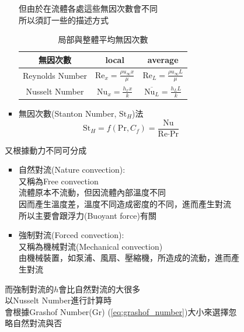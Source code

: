\documentclass[../main.tex]{subfiles}
\begin{document}
\begin{itemize}
\begin{itemize}
\begin{itemize}
\begin{enumerate}
\begin{itemize}
            但由於在流體各處這些無因次數會不同\\
            所以須訂一些的描述方式
            \renewcommand{\arraystretch}{2}
            \begin{table}[H]
              \centering
              \begin{tabular}{c|c|c}
                無因次數 & local & average \\
                \hline
                Reynolds Number & $\text{Re}_x = \frac{\rho u_\infty x}{\mu}$ & 
                  $\text{Re}_L = \frac{\rho u_\infty L}{\mu}$ \\
                \hline
                Nusselt Number & $\text{Nu}_x = \frac{h_x x}{k}$ & 
                  $\overline{\text{Nu}_L} = \frac{h_L L}{k}$ 
              \end{tabular}
              \caption{局部與整體平均無因次數}
            \end{table}
            \item 無因次數(Stanton Number, $\text{St}_H$)法
            \begin{equation}
              \text{St}_H = f(\text{Pr}, C_f)  = \frac{\text{Nu}}{\text{Re}\cdot \text{Pr}}
            \end{equation}
          \end{itemize}
          又根據動力不同可分成
          \begin{itemize}
            \item 自然對流(Nature convection):\\
              又稱為Free convection\\
              流體原本不流動，但因流體內部溫度不同\\
              因而產生溫度差，溫度不同造成密度的不同，進而產生對流\\
              所以主要會跟浮力(Buoyant force)有關
            \item 強制對流(Forced convection):\\
              又稱為機械對流(Mechanical convection)\\
              由機械裝置，如泵浦、風扇、壓縮機，所造成的流動，進而產生對流
          \end{itemize}
          而強制對流的$h$會比自然對流的大很多\\
          以Nusselt Number進行計算時\\
          會根據Grashof Number(Gr) (\ref{eq:grashof_number})大小來選擇忽略自然對流與否

\end{enumerate}
\end{itemize}
\end{itemize}
\end{itemize}
\end{document}
